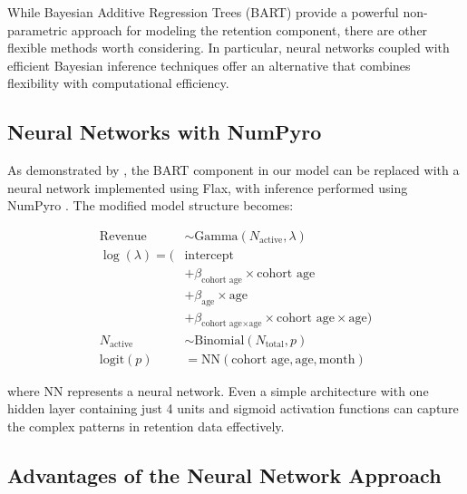 \documentclass[11pt]{amsart}
\theoremstyle{definition}
\begin{document}
While Bayesian Additive Regression Trees (BART) provide a powerful non-parametric approach for modeling the retention
component, there are other flexible methods worth considering. In particular, neural networks coupled with efficient
Bayesian inference techniques offer an alternative that combines flexibility with computational efficiency.

\subsection{Neural Networks with NumPyro}

As demonstrated by \cite{orduz_revenue_retention_numpyro}, the BART component in our model can be replaced with a neural
network implemented using Flax, with inference performed using NumPyro \cite{phan2019composable}. The modified model
structure becomes:

\begin{align*}
    \text{Revenue}    & \sim \text{Gamma}(N_{\text{active}}, \lambda)                                             \\
    \log(\lambda) = ( & \text{intercept}                                                                          \\
                      & + \beta_{\text{cohort age}} \times \text{cohort age}                                      \\
                      & + \beta_{\text{age}} \times \text{age}                                                    \\
                      & + \beta_{\text{cohort age} \times \text{age}} \times \text{cohort age} \times \text{age}) \\
    N_{\text{active}} & \sim \text{Binomial}(N_{\text{total}}, p)                                                 \\
    \textrm{logit}(p) & = \text{NN}(\text{cohort age}, \text{age}, \text{month})
\end{align*}

where $\text{NN}$ represents a neural network. Even a simple architecture with one hidden layer containing just 4 units and
sigmoid activation functions can capture the complex patterns in retention data effectively.

\subsection{Advantages of the Neural Network Approach}
\end{document}

